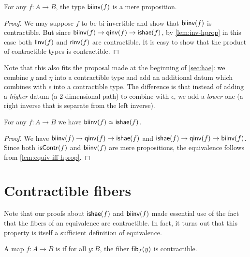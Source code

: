 \begin{thm}\label{thm:isprop-biinv}
  For any $f:A\to B$, the type $\mathsf{biinv}(f)$ is a mere proposition.
\end{thm}
\begin{proof}
  We may suppose $f$ to be bi-invertible and show that $\mathsf{biinv}(f)$ is contractible.
  But since $\mathsf{biinv}(f)\to\mathsf{qinv}(f) \to \mathsf{ishae}(f)$, by \autoref{lem:inv-hprop} in this case both $\mathsf{linv}(f)$ and $\mathsf{rinv}(f)$ are contractible.
  It is easy to show that the product of contractible types is contractible.
\end{proof}

Note that this also fits the proposal made at the beginning of \autoref{sec:hae}: we combine $g$ and $\eta$ into a contractible type and add an additional datum which combines with $\epsilon$ into a contractible type.
The difference is that instead of adding a \emph{higher} datum (a 2-dimensional path) to combine with $\epsilon$, we add a \emph{lower} one (a right inverse that is separate from the left inverse).

\begin{cor}\label{thm:equiv-biinv-isequiv}
  For any $f:A\to B$ we have $\mathsf{biinv}(f) \simeq \mathsf{ishae}(f)$.
\end{cor}
\begin{proof}
  We have $\mathsf{biinv}(f) \to \mathsf{qinv}(f) \to \mathsf{ishae}(f)$ and $\mathsf{ishae}(f) \to \mathsf{qinv}(f) \to \mathsf{biinv}(f)$.
  Since both $\mathsf{isContr}(f)$ and $\mathsf{biinv}(f)$ are mere propositions, the equivalence follows from \autoref{lem:equiv-iff-hprop}.
\end{proof}


\section{Contractible fibers}
\label{sec:contrf}

Note that our proofs about $\mathsf{ishae}(f)$ and $\mathsf{biinv}(f)$ made essential use of the fact that the fibers of an equivalence are contractible.
In fact, it turns out that this property is itself a sufficient definition of equivalence.

\begin{defn} \label{defn:equivalence}
  A map $f:A\to B$ is 
  if for all $y:B$, the fiber ${\mathsf{fib}}_{f}(y)$ is contractible.
\end{defn}

